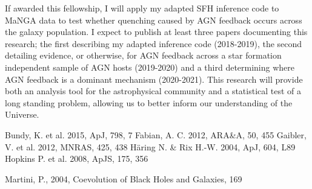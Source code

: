 \documentclass[11pt]{article}
\begin{document}
If awarded this fellowship, I will apply my adapted SFH inference code to MaNGA data to test whether quenching caused by AGN feedback occurs across the galaxy population. I expect to publish at least three papers documenting this research; the first describing my adapted inference code (2018-2019), the second detailing evidence, or otherwise, for AGN feedback across a star formation independent sample of AGN hosts (2019-2020) and a third determining where AGN feedback is a dominant mechanism (2020-2021). This research will provide both an analysis tool for the astrophysical community and a statistical test of a long standing 	problem, allowing us to better inform our understanding of the Universe.

\vspace{-0.5em}

\begin{thebibliography}{}
{\fontsize{7.5pt}{2pt}\selectfont
\begin{minipage}[t]{0.3\textwidth}
 Bundy, K. et al. 2015, ApJ, 798, 7
 Fabian, A. C. 2012, ARA\&A, 50, 455
 Gaibler, V. et al. 2012, MNRAS, 425, 438
 H\"aring N. \& Rix H.-W. 2004, ApJ, 604, L89
 Hopkins P. et al. 2008, ApJS, 175, 356 
\end{minipage}
\hspace{0.5cm}
\begin{minipage}[t]{0.3\textwidth}
 Martini, P., 2004, Coevolution of Black Holes and Galaxies, 169


\end{minipage}}
\end{thebibliography}
\end{document}
